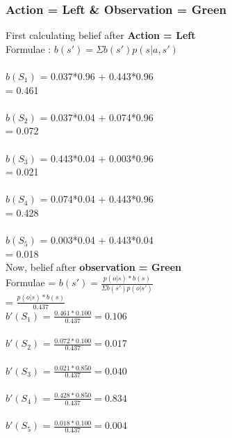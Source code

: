 \documentclass[10pt,letterpaper]{article}
\begin{document}
\subsubsection*{Action = Left \& Observation = Green}
First calculating belief after \textbf{Action = Left}\\
Formulae : $b(s') = \Sigma b(s')p(s|a,s')$\\\\
$b(S_1)$ =  0.037*0.96 + 0.443*0.96\\ \hspace*{23pt} = 0.461\\\\
$b(S_2)$ =  0.037*0.04 + 0.074*0.96\\ \hspace*{23pt} = 0.072\\\\
$b(S_3)$ =  0.443*0.04 + 0.003*0.96\\ \hspace*{23pt} = 0.021\\\\
$b(S_4)$ =  0.074*0.04 + 0.443*0.96\\ \hspace*{23pt} = 0.428\\\\
$b(S_5)$ =  0.003*0.04 + 0.443*0.04\\ \hspace*{23pt} = 0.018\\

\noindent Now, belief after \textbf{observation = Green}\\
Formulae = $b(s') = \frac{p(o|s)*b(s)}{\Sigma b(s')p(o|s')}$\\
\hspace*{74pt} = $\frac{p(o|s)*b(s)}{0.437}$\\

\noindent $b'(S_1)$ = $\frac{0.461*0.100}{0.437} = 0.106$\\\\
$b'(S_2)$ = $\frac{0.072*0.100}{0.437} = 0.017$\\\\
$b'(S_3)$ = $\frac{0.021*0.850}{0.437} = 0.040$\\\\
$b'(S_4)$ = $\frac{0.428*0.850}{0.437} = 0.834$\\\\
$b'(S_5)$ = $\frac{0.018*0.100}{0.437} = 0.004$\\\\
\end{document}
